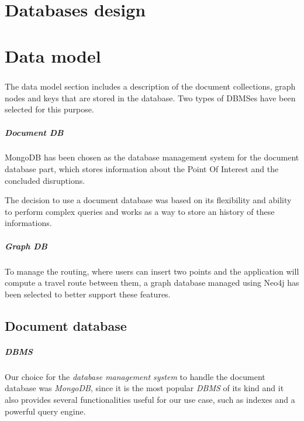 \chapter{Databases design}



\chapter{Data model}

\paragraph{}
The data model section includes a description of the document collections, 
graph nodes and keys that are stored in the database. Two types of DBMSes have 
been selected for this purpose. 

\paragraph{Document DB}
MongoDB has been chosen as the database management system for the document 
database part, which stores information about the Point Of Interest and the 
concluded disruptions.

The decision to use a document database was based on its flexibility and 
ability to perform complex queries and works as a way to store an history of 
these informations.

\paragraph{Graph DB}
To manage the routing, where users can insert two points and the application will compute a travel route between them, a graph database managed using Neo4j has been selected to better support these features.

\section{Document database}

\paragraph{DBMS} Our choice for the \textit{database management system} to 
handle the document database was \textit{MongoDB}, since it is the most popular 
\textit{DBMS} of its kind and it also provides several functionalities useful 
for our use case, such as indexes and a powerful query engine.

